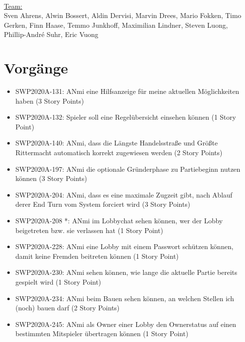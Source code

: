 \documentclass[12pt,a4paper, oneside]{article}
\begin{document}

    \noindent
    \\
    \underline {Team:}
    \\
    Sven Ahrens, Alwin Bossert, Aldin Dervisi, Marvin Drees, Mario Fokken,
    Timo Gerken, Finn Haase, Temmo Junkhoff, Maximilian Lindner, Steven Luong, Phillip-André Suhr, Eric Vuong


    \section{Vorgänge}
    \begin{itemize}
        \item SWP2020A-131: ANmi eine Hilfsanzeige für meine aktuellen Möglichkeiten haben (3 Story Points)

        \item SWP2020A-132: Spieler soll eine Regelübersicht einsehen können (1 Story Point)

        \item SWP2020A-140: ANmi, dass die Längste Handelsstraße und Größte Rittermacht automatisch korrekt zugewiesen werden (2  Story Points)

        \item SWP2020A-197: ANmi die optionale Gründerphase zu Partiebeginn nutzen können (3 Story Points)

        \item SWP2020A-204: ANmi, dass es eine maximale Zugzeit gibt, nach Ablauf derer End Turn vom System forciert wird (3 Story Points)

        \item SWP2020A-208 *: ANmi im Lobbychat sehen können, wer der Lobby beigetreten bzw. sie verlassen hat (1 Story Point)

        \item SWP2020A-228: ANmi eine Lobby mit einem Passwort schützen können, damit keine Fremden beitreten können (1 Story Point)

        \item SWP2020A-230: ANmi sehen können, wie lange die aktuelle Partie bereits gespielt wird (1 Story Point)

        \item SWP2020A-234: ANmi beim Bauen sehen können, an welchen Stellen ich (noch) bauen darf (2 Story Points)

        \item SWP2020A-245: ANmi als Owner einer Lobby den Ownerstatus auf einen bestimmten Mitspieler übertragen können (1  Story Point)


\end{itemize}
\end{document}

